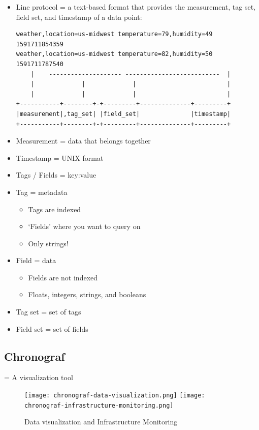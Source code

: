 \documentclass{article}
\begin{document}
\begin{itemize}
    \item Line protocol = a text-based format that provides the measurement, tag set, field set, and timestamp of a data point:
\begin{verbatim}
weather,location=us-midwest temperature=79,humidity=49 1591711854359    
weather,location=us-midwest temperature=82,humidity=50 1591711787540   
    |    -------------------- --------------------------  |
    |             |             |                         |
    |             |             |                         |
+-----------+--------+-+---------+--------------+---------+
|measurement|,tag_set| |field_set|              |timestamp|
+-----------+--------+-+---------+--------------+---------+
\end{verbatim}
    \item Measurement = data that belongs together
    \item Timestamp = UNIX format
    \item Tags / Fields = key:value
    \item Tag = metadata
    \begin{itemize}
        \item Tags are indexed
        \item `Fields' where you want to query on
        \item Only strings!
    \end{itemize}
    \item Field = data
    \begin{itemize}
        \item Fields are not indexed
        \item Floats, integers, strings, and booleans
    \end{itemize}
    \item Tag set = set of tags
    \item Field set = set of fields
\end{itemize}

\subsection{Chronograf}

= A visualization tool

\begin{figure}[H]
    \centering
    \texttt{[image: chronograf-data-visualization.png]}
    \texttt{[image: chronograf-infrastructure-monitoring.png]}
    \caption{Data visualization and Infrastructure Monitoring}
\end{figure}
\end{document}
